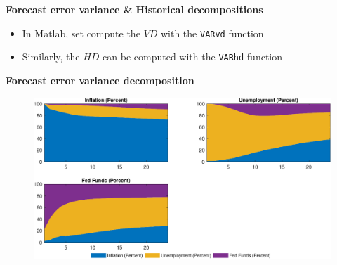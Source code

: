 
\begin{frame}
{\textbf{Forecast error variance \& Historical decompositions}}\bigskip

\begin{itemize}
\item In Matlab, set compute the $VD$ with the \colorbox{script!80}{\small%
\texttt{VARvd}} function\medskip

\begin{minipage}[b]{.9\textwidth}
\end{minipage}

\bigskip

\item Similarly, the $HD$ can be computed with the \colorbox{script!80}{%
\small\texttt{VARhd}} function\medskip

\begin{minipage}[b]{.9\textwidth}
\end{minipage}
\end{itemize}
\end{frame}


\begin{frame}
{\textbf{Forecast error variance decomposition}}\medskip

\begin{figure}[h]
\includegraphics[width=.75\textwidth]{SW_VD.pdf}
\end{figure}
\end{frame}

